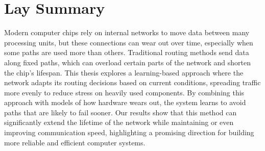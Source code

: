 \chapter{Lay Summary}
Modern computer chips rely on internal networks to move data between many processing units, but these connections can wear out over time, especially when some paths are used more than others. Traditional routing methods send data along fixed paths, which can overload certain parts of the network and shorten the chip's lifespan. This thesis explores a learning-based approach where the network adapts its routing decisions based on current conditions, spreading traffic more evenly to reduce stress on heavily used components. By combining this approach with models of how hardware wears out, the system learns to avoid paths that are likely to fail sooner. Our results show that this method can significantly extend the lifetime of the network while maintaining or even improving communication speed, highlighting a promising direction for building more reliable and efficient computer systems.